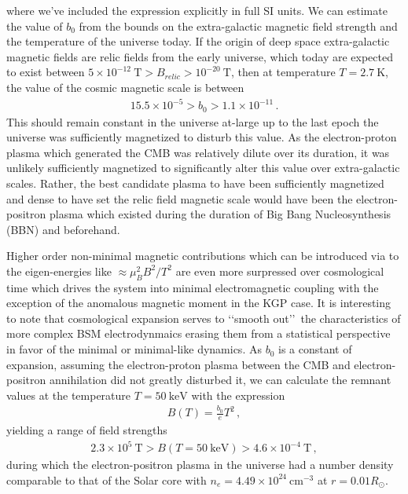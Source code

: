 where we've included the expression explicitly in full SI units. We can estimate the value of $b_{0}$ from the bounds on the extra-galactic magnetic field strength and the temperature of the universe today.  If the origin of deep space extra-galactic magnetic fields are relic fields from the early universe, which today are expected to exist between $5\times10^{-12}\ \mathrm{T}>B_{relic}>10^{-20}\ \mathrm{T}$, then at temperature $T=2.7\ \mathrm{K}$, the value of the cosmic magnetic scale is between
\begin{alignat}{1}
    \label{BoScale} 5.5\times10^{-5}>b_{0}>1.1\times10^{-11}\,.
\end{alignat}
This should remain constant in the universe at-large up to the last epoch the universe was sufficiently magnetized to disturb this value. As the electron-proton plasma which generated the CMB was relatively dilute over its duration, it was unlikely sufficiently magnetized to significantly alter this value over extra-galactic scales. Rather, the best candidate plasma to have been sufficiently magnetized and dense to have set the relic field magnetic scale would have been the electron-positron plasma which existed during the duration of Big Bang Nucleosynthesis (BBN) and beforehand.

Higher order non-minimal magnetic contributions which can be introduced via  to the eigen-energies like $\approx\mu_{B}^{2}B^{2}/T^{2}$ are even more surpressed over cosmological time which drives the system into minimal electromagnetic coupling with the exception of the anomalous magnetic moment in the KGP case. It is interesting to note that cosmological expansion serves to \lq\lq smooth out\rq\rq\ the characteristics of more complex BSM electrodynmaics erasing them from a statistical perspective in favor of the minimal or minimal-like dynamics. As $b_0$ is a constant of expansion, assuming the electron-proton plasma between the CMB and electron-positron annihilation did not greatly disturbed it, we can calculate the remnant values at the temperature $T=50\ \mathrm{keV}$ with the expression
\begin{align}
  \label{BBNFields} B(T)=\frac{b_{0}}{e}T^{2}\,,
\end{align}
yielding a range of field strengths
\begin{align}
  \label{BBNRange} 2.3\times10^{5}\ \mathrm{T}>B(T=50\ \mathrm{keV})>4.6\times10^{-4}\ \mathrm{T}\,,
\end{align}
during which the electron-positron plasma in the universe had a number density comparable to that of the Solar core with $n_{e}=4.49\times10^{24}\ \mathrm{cm}^{-3}$ at $r=0.01R_{\odot}$.

